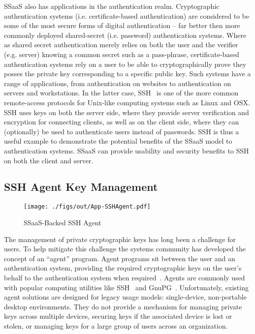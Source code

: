 SSaaS also has applications in the authentication realm. Cryptographic
authentication systems (i.e. certificate-based authentication) are
considered to be some of the most secure forms of digital
authentication -- far better then more commonly deployed shared-secret
(i.e. password) authentication systems. Where as shared secret
authentication merely relies on both the user and the verifier
(e.g. server) knowing a common secret such as a pass-phrase,
certificate-based authentication systems rely on a user to be able to
cryptographically prove they posses the private key corresponding to a
specific public key. Such systems have a range of applications, from
authentication on websites to authentication on servers and
workstations. In the latter case, SSH~\cite{ylonen1996} is one of the
more common remote-access protocols for Unix-like computing systems
such as Linux and OSX. SSH uses keys on both the server side, where
they provide server verification and encryption for connecting
clients, as well as on the client side, where they can (optionally) be
used to authenticate users instead of passwords. SSH is thus a useful
example to demonstrate the potential benefits of the SSaaS model to
authentication systems. SSaaS can provide usability and security
benefits to SSH on both the client and server.

\subsection{SSH Agent Key Management}

\begin{figure}[t]
  \centering
  \texttt{[image: ./figs/out/App-SSHAgent.pdf]}
  \caption{SSaaS-Backed SSH Agent}
  \label{fig:app-sshagent}
\end{figure}

The management of private cryptographic keys has long been a challenge
for users. To help mitigate this challenge the systems community has
developed the concept of an ``agent'' program. Agent programs sit
between the user and an authentication system, providing the required
cryptographic keys on the user's behalf to the authentication system
when required~\cite{cox2002}. Agents are commonly used with popular
computing utilities like SSH~\cite{ylonen1996} and
GnuPG~\cite{gnupg}. Unfortunately, existing agent solutions are
designed for legacy usage models: single-device, non-portable desktop
environments. They do not provide a mechanism for managing private
keys across multiple devices, securing keys if the associated device
is lost or stolen, or managing keys for a large group of users across
an organization.

